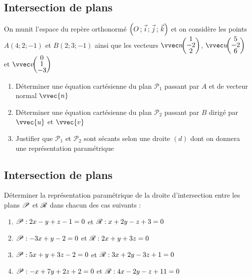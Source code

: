 \documentclass[oneside,12pt]{book}          %
\begin{document}
\subsection{Intersection de plans}
On munit l'espace du repère orthonormé $\left(O\,;\,\Vec{i}\,;\,\Vec{j}\,;\,\Vec{k}\right)$ et on considère les points $A(4;2;-1)$ et $B(2;3;-1)$ ainsi que les vecteurs $\vcoord{n}{1\\-2\\2}$, $\vcoord{u}{5\\-2\\6}$ et $\vcoord{v}{0\\1\\-3}$
    \begin{enumerate}
        \item Déterminer une équation cartésienne du plan $\mathscr{P}_1$ passant par $A$ et de vecteur normal $\vvec{n}$
        \item Déterminer une équation cartésienne du plan $\mathscr{P}_2$ passant par $B$ dirigé par $\vvec{u}$ et $\vvec{v}$
        \item Justifier que $\mathscr{P}_1$ et $\mathscr{P}_2$ sont sécants selon une droite $(d)$ dont on donnera une représentation paramétrique     
    \end{enumerate}



\subsection{Intersection de plans}
Déterminer la représentation paramétrique de la droite d'intersection entre les plans ${\mathscr{P}}$ et ${\mathscr{R}}$ dans chacun des cas suivants :
\begin{enumerate}
	\item ${\mathscr{P}}:2x-y+z-1=0$ \quad et \quad ${\mathscr{R}}:x+2y-z+3=0$
	\item ${\mathscr{P}}:-3x+y-2=0$ \quad et \quad ${\mathscr{R}}:2x+y+3z=0$
	\item ${\mathscr{P}}:5x+y+3z-2=0$ \quad et \quad ${\mathscr{R}}:3x+2y-3z+1=0$
	\item ${\mathscr{P}}:-x+7y+2z+2=0$ \quad et \quad ${\mathscr{R}}:4x-2y-z+11=0$
\end{enumerate}
\end{document}
